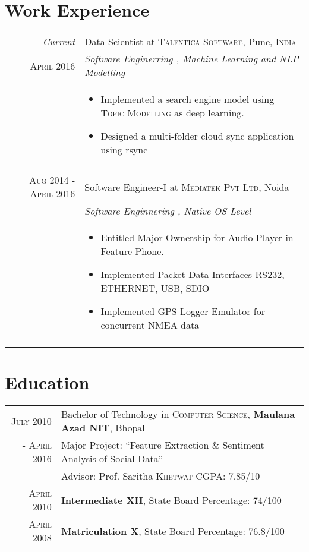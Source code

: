 \documentclass[a4paper,10pt]{article}
\begin{document}
\section{Work Experience}
\begin{tabular}{r|p{13cm}}
 \emph{Current} & Data Scientist at \textsc{Talentica Software}, Pune, \textsc{India} \\\textsc{April 2016}&\emph{Software Enginerring , Machine Learning and NLP Modelling}\\&\footnotesize
\begin{itemize}
\item Implemented a search engine model using \textsc{Topic Modelling} as deep learning.
\item Designed a multi-folder cloud sync application using rsync
\end{itemize}\\
\multicolumn{2}{c}{} \\
 \textsc{Aug 2014 - April 2016} & Software Engineer-I at \textsc{Mediatek Pvt Ltd}, Noida \\&\emph{Software Enginnering , Native OS Level}\\&\footnotesize
 \begin{itemize}
\item Entitled Major Ownership for Audio Player in Feature Phone.
\item Implemented Packet Data Interfaces \textsc{RS232, ETHERNET, USB, SDIO}
\item Implemented GPS Logger Emulator for concurrent \textsc{NMEA} data
\end{itemize} \\
\multicolumn{2}{c}{}
\end{tabular}

\section{Education}
\begin{tabular}{rl}	
 \textsc{July} 2010 & Bachelor of Technology in \textsc{Computer Science}, \textbf{Maulana Azad NIT}, Bhopal\\\textsc{- April 2016}
& Major Project: ``Feature Extraction \& Sentiment Analysis
of Social Data'' \\ 
& \small Advisor: Prof. Saritha \textsc{Khetwat}
{\hfill CGPA: 7.85/10} \\

\textsc{April} 2010& \textbf{Intermediate XII}, State Board {\hfill Percentage: 74/100} \\

\textsc{April} 2008& \textbf{Matriculation X}, State Board {\hfill Percentage: 76.8/100} \\
\end{tabular}
\break
\end{document}
